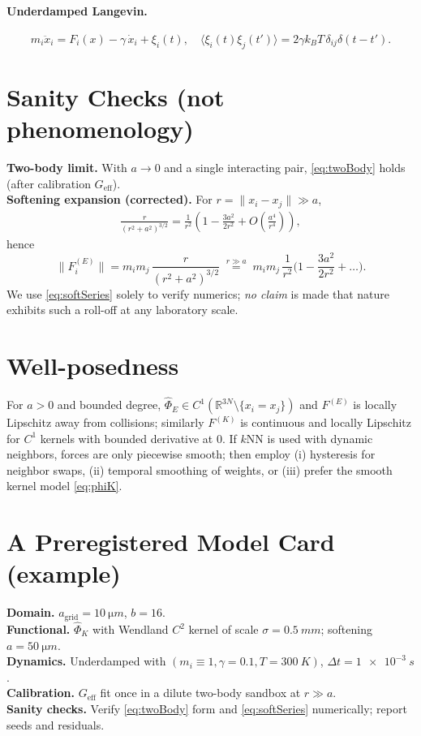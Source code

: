 \documentclass[11pt,a4paper]{article}
\numberwithin{equation}{section}
\newcommand{\R}{\mathbb{R}}
\begin{document}
\paragraph{Underdamped Langevin.}
\begin{equation}
m_i\ddot{x}_i = F_i(x)-\gamma\,\dot{x}_i + \xi_i(t),\quad
\langle \xi_i(t)\xi_j(t')\rangle=2\gamma k_B T\,\delta_{ij}\delta(t-t').
\end{equation}

\section{Sanity Checks (not phenomenology)}
\textbf{Two-body limit.} With $a\to 0$ and a single interacting pair, \eqref{eq:twoBody} holds (after calibration $G_{\text{eff}}$).\\
\textbf{Softening expansion (corrected).} For $r=\lVert x_i-x_j\rVert\gg a$,
\begin{align}
\label{eq:softSeries}
\frac{r}{(r^2+a^2)^{3/2}}
= \frac{1}{r^2}\left(1-\frac{3a^2}{2r^2}+O\!\left(\frac{a^4}{r^4}\right)\right),
\end{align}
hence
\begin{equation}
\label{eq:forceCorrect}
\big\lVert F^{(E)}_i\big\rVert
= m_im_j\,\frac{r}{(r^2+a^2)^{3/2}}
\;\stackrel{r\gg a}{=}\; m_im_j\,\frac{1}{r^2}\Big(1-\frac{3a^2}{2r^2}+\dots\Big).
\end{equation}
We use \eqref{eq:softSeries} solely to verify numerics; \emph{no claim} is made that nature exhibits such a roll-off at any laboratory scale.

\section{Well-posedness}
For $a>0$ and bounded degree, $\widehat{\Phi}_E\in C^1(\R^{3N}\setminus\{x_i=x_j\})$ and $F^{(E)}$ is locally Lipschitz away from collisions; similarly $F^{(K)}$ is continuous and locally Lipschitz for $C^1$ kernels with bounded derivative at $0$. If $k$NN is used with dynamic neighbors, forces are only piecewise smooth; then employ (i) hysteresis for neighbor swaps, (ii) temporal smoothing of weights, or (iii) prefer the smooth kernel model \eqref{eq:phiK}.

\section{A Preregistered Model Card (example)}
\textbf{Domain.} $a_{\text{grid}}=\SI{10}{\micro m}$, $b=16$. \\
\textbf{Functional.} $\widehat{\Phi}_K$ with Wendland $C^2$ kernel of scale $\sigma=\SI{0.5}{mm}$; softening $a=\SI{50}{\micro m}$. \\
\textbf{Dynamics.} Underdamped with $(m_i\equiv 1,\gamma=0.1,T=\SI{300}{K})$, $\Delta t=\SI{1e-3}{s}$. \\
\textbf{Calibration.} $G_{\text{eff}}$ fit once in a dilute two-body sandbox at $r\gg a$. \\
\textbf{Sanity checks.} Verify \eqref{eq:twoBody} form and \eqref{eq:softSeries} numerically; report seeds and residuals.
\end{document}
